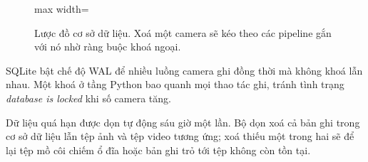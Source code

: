 \begin{figure}[H]
\begin{adjustbox}{max width=\textwidth}
\end{adjustbox}
\caption{Lược đồ cơ sở dữ liệu. Xoá một camera sẽ kéo theo các pipeline gắn với
nó nhờ ràng buộc khoá ngoại.}
\label{fig:csdl}
\end{figure}

SQLite bật chế độ WAL để nhiều luồng camera ghi đồng thời mà không khoá lẫn nhau.
Một khoá ở tầng Python bao quanh mọi thao tác ghi, tránh tình trạng
\emph{database is locked} khi số camera tăng.

Dữ liệu quá hạn được dọn tự động sáu giờ một lần. Bộ dọn xoá cả bản ghi trong cơ
sở dữ liệu lẫn tệp ảnh và tệp video tương ứng; xoá thiếu một trong hai sẽ để lại
tệp mồ côi chiếm ổ đĩa hoặc bản ghi trỏ tới tệp không còn tồn tại.
